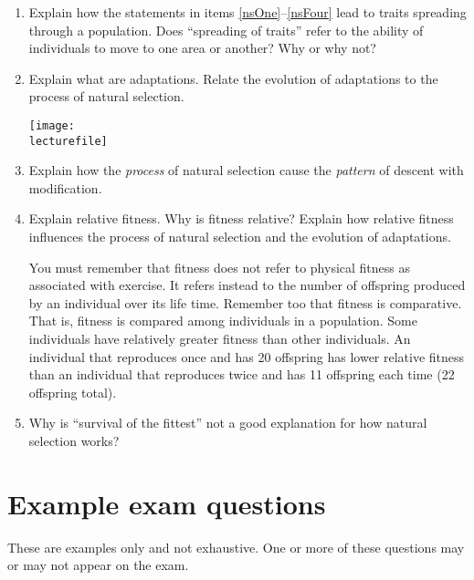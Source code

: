\documentclass[letterpaper]{tufte-handout}
\newcommand\lecturefile{163_lecture03_fullsize}
\begin{document}
\begin{enumerate}
	\item Explain how the statements in items \ref{nsOne}--\ref{nsFour} lead to traits spreading through a population. Does “spreading of traits” refer to the ability of individuals to move to one area or another? Why or why not?

	\item Explain what are adaptations. Relate the evolution of adaptations to the process of natural selection.
	\begin{marginfigure}
		\texttt{[image: \\lecturefile]}
	\end{marginfigure}
	
	\item Explain how the \emph{process} of natural selection cause the \emph{pattern} of descent with modification.

	\item Explain relative fitness. Why is fitness relative? Explain how relative fitness influences the process of natural selection and the evolution of adaptations.  
	
	You must remember that fitness does not refer to physical fitness as associated with exercise. It refers instead to the number of offspring produced by an individual over its life time. Remember too that fitness is comparative. That is, fitness is compared among individuals in a population. Some individuals have relatively greater fitness than other individuals. An individual that reproduces once and has 20 offspring has lower relative fitness than an individual that reproduces twice and has 11 offspring each time (22 offspring total).

	\item Why is ``survival of the fittest'' not a good explanation for how natural selection works?


\end{enumerate}

\section*{Example exam questions}

These are examples only and not exhaustive. One or more of these questions may or may not appear on the exam.

\bigskip
\end{document}
